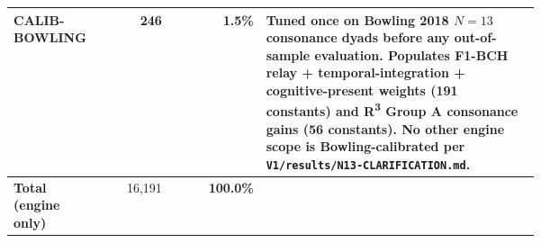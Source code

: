 \begin{table}[t]
\begin{tabular}{p{0.16\linewidth}rrp{0.52\linewidth}}
CALIB-BOWLING & 246 & 1.5\% & Tuned once on Bowling 2018 \(N{=}13\) consonance dyads before any out-of-sample evaluation. Populates F1-BCH relay + temporal-integration + cognitive-present weights (191 constants) and R\textsuperscript{3} Group A consonance gains (56 constants). No other engine scope is Bowling-calibrated per \texttt{V1/results/N13-CLARIFICATION.md}. \\
\midrule
\textbf{Total (engine only)} & 16,191 & \textbf{100.0\%} & \\
\bottomrule
\end{tabular}
\end{table}
